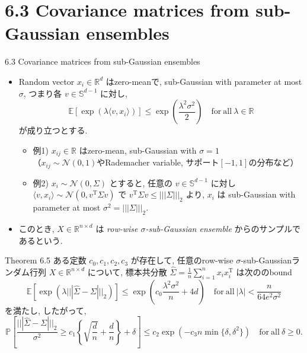 \documentclass[unicode,aspectratio=169,11pt]{beamer}
\newcommand{\ex}{\mathbb{E}}
\newcommand{\bb}{\mathbb}
\newcommand{\cc}{\mathcal}
\newcommand{\tr}{\mathrm{T}}
\begin{document}
\section{6.3 Covariance matrices from sub-Gaussian ensembles}
\begin{frame}{6.3 Covariance matrices from sub-Gaussian ensembles}{}
  \begin{itemize}
    \item Random vector $x_i \in \bb{R}^d$ はzero-meanで, sub-Gaussian with parameter at most $\sigma$, つまり各 $v \in \bb{S}^{d-1}$ に対し,
          \[
              \ex\left[\exp\left(\lambda \langle v, x_i \rangle\right)\right]
              \le \exp\left(\frac{\lambda^2\sigma^2}{2}\right)
              \quad \mathrm{for\ all}\ \lambda \in \bb{R}
              \tag{6.18}
          \]
          が成り立つとする.
          \begin{itemize}
            \item 例1) $x_{ij} \in \bb{R}$ はzero-mean, sub-Gaussian with $\sigma = 1$\\
                  （$x_{ij} \sim \cc{N}(0,1)$やRademacher variable, サポート$[-1,1]$の分布など）
            \item 例2) $x_i \sim \cc{N}(0, \Sigma)$ とすると,
            任意の $v \in \bb{S}^{d-1}$ に対し $\langle v, x_i \rangle \sim \cc{N}(0, v^\tr \Sigma v)$ で $v^\tr \Sigma v \le |||\Sigma|||_2$ より,
            $x_i$ は sub-Gaussian with parameter at most $\sigma^2 = |||\Sigma|||_2$.
          \end{itemize}
    \item このとき, $X \in \bb{R}^{n \times d}$ は {\it row-wise $\sigma$-sub-Gaussian ensemble} からのサンプルであるという.
  \end{itemize}
\end{frame}

\begin{frame}
  \begin{block}{Theorem 6.5}
    ある定数 $c_0, c_1, c_2 , c_3$ が存在して,
    任意のrow-wise $\sigma$-sub-Gaussianランダム行列 $X \in \bb{R}^{n \times d}$ について,
    標本共分散 $\widehat{\Sigma} = \frac{1}{n}\sum_{i=1}^n x_i x_i^\tr$ は次ののbound
    \[
      \ex\left[ \exp\left( \lambda |||\widehat{\Sigma} - \Sigma|||_2 \right) \right]
      \le \exp\left( c_0\frac{\lambda^2\sigma^2}{n} + 4d \right)
      \quad \mathrm{for\ all}\ |\lambda| < \frac{n}{64e^2\sigma^2}
      \tag{6.19a}
    \]
    を満たし, したがって,
    \[
      \bb{P}\left[ \frac{|||\widehat{\Sigma} - \Sigma|||_2}{\sigma^2} \ge c_1 \left\{ \sqrt{\frac{d}{n}} + \frac{d}{n} \right\} + \delta \right]
      \le c_2 \exp\left(-c_3 n \min\{\delta, \delta^2\}\right)
      \quad \mathrm{for\ all}\ \delta \ge 0.
      \tag{6.19b}
    \]
  \end{block}
\end{frame}
\end{document}
